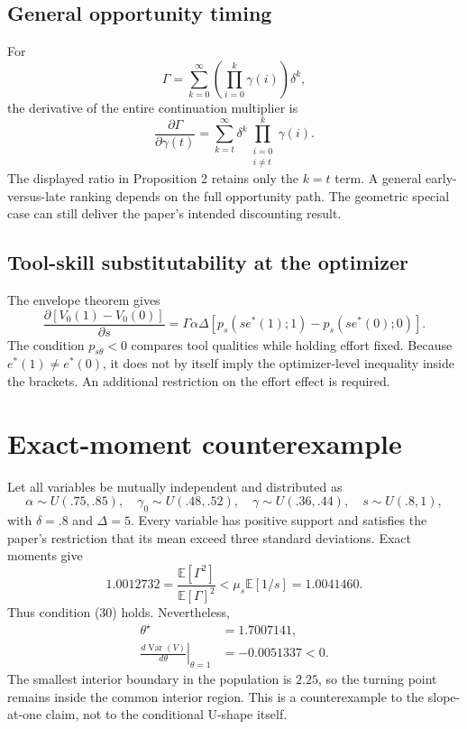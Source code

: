 \documentclass[11pt]{article}
\newcommand{\E}{\mathbb{E}}
\newcommand{\Var}{\operatorname{Var}}
\begin{document}
\subsection{General opportunity timing}

For
\begin{equation}
  \Gamma=\sum_{k=0}^{\infty}
  \left(\prod_{i=0}^{k}\gamma(i)\right)\delta^k,
\end{equation}
the derivative of the entire continuation multiplier is
\begin{equation}
  \frac{\partial\Gamma}{\partial\gamma(t)}
  =\sum_{k=t}^{\infty}\delta^k
  \prod_{\substack{i=0\\ i\ne t}}^{k}\gamma(i).
\end{equation}
The displayed ratio in Proposition 2 retains only the $k=t$ term. A general
early-versus-late ranking depends on the full opportunity path. The geometric
special case can still deliver the paper's intended discounting result.

\subsection{Tool-skill substitutability at the optimizer}

The envelope theorem gives
\begin{equation}
  \frac{\partial[V_0(1)-V_0(0)]}{\partial s}
  =\Gamma\alpha\Delta
  \left[p_s(se^*(1);1)-p_s(se^*(0);0)\right].
\end{equation}
The condition $p_{s\theta}<0$ compares tool qualities while holding effort
fixed. Because $e^*(1)\ne e^*(0)$, it does not by itself imply the
optimizer-level inequality inside the brackets. An additional restriction on
the effort effect is required.

\section{Exact-moment counterexample}

Let all variables be mutually independent and distributed as
\begin{equation}
  \alpha\sim U(.75,.85),\quad
  \gamma_0\sim U(.48,.52),\quad
  \gamma\sim U(.36,.44),\quad
  s\sim U(.8,1),
\end{equation}
with $\delta=.8$ and $\Delta=5$. Every variable has positive support and
satisfies the paper's restriction that its mean exceed three standard
deviations. Exact moments give
\begin{equation}
  1.0012732
  =\frac{\E[\Gamma^2]}{\E[\Gamma]^2}
  <\mu_s\E[1/s]
  =1.0041460.
\end{equation}
Thus condition (30) holds. Nevertheless,
\begin{align}
  \theta^\star&=1.7007141,\\
  \left.\frac{d\Var(V)}{d\theta}\right|_{\theta=1}
  &=-0.0051337<0.
\end{align}
The smallest interior boundary in the population is $2.25$, so the turning
point remains inside the common interior region. This is a counterexample to
the slope-at-one claim, not to the conditional U-shape itself.
\end{document}
